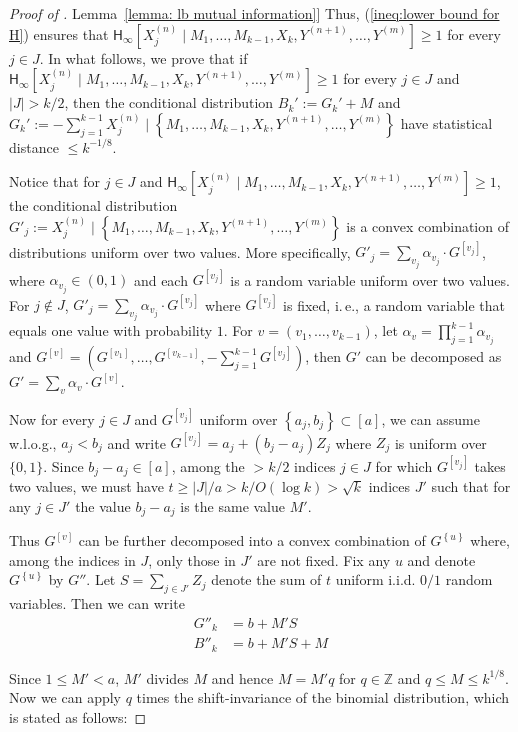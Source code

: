 \documentclass[11pt]{article}
\numberwithin{equation}{section}
\theoremstyle{definition}
\theoremstyle{plain}
\newcommand{\Z}{\mathbb Z}
\newcommand{\ie}{i.\,e.}
\newcommand{\expref}[2]{\hyperref[#2]{#1~\ref{#2}}}
\newcommand{\set}[1]{{\left \{{#1} \right \}}}
\newcommand{\cond}{\;|\;}
\newcommand{\Cond}{\;\Big|\;}
\newcommand{\zo}{\ensuremath{ \{ 0, 1 \} }}
\newcommand{\bigo}[1]{\ensuremath{{{O} \left( {#1} \right)}}}
\newcommand{\eqdef}{\ensuremath{:=}}
\newcommand{\Hmin}{\ensuremath{\mathsf{H}_{\infty}}}
\begin{document}
\begin{proof}[Proof of \expref{Lemma}{lemma: lb mutual information}]
		Thus, (\ref{ineq:lower bound for H}) ensures that $\Hmin\left[X^{(n)}_{j} \cond M_1,\ldots, M_{k-1}, X_k, Y^{(n+1)},\ldots, Y^{(m)} \right]\ge 1$ for every $j\in J$.
%
		In what follows, we prove that if $\Hmin\left[X^{(n)}_{j} \cond M_1,\ldots, M_{k-1}, X_k, Y^{(n+1)},\ldots, Y^{(m)} \right]\ge 1$ for every $j\in J$ and $|J|>k/2$, 
		then the conditional distribution
		$B_k'\eqdef G_k'+M$  and
		$G_k'\eqdef -\sum_{j=1}^{k-1}X^{(n)}_{j} \Cond \set{M_1,\ldots, M_{k-1}, X_k, Y^{(n+1)},\ldots, Y^{(m)}}$ have statistical distance $\le k^{-1/8}$.

		Notice that for $j\in J$ and $\Hmin\left[X^{(n)}_{j} \cond M_1,\ldots, M_{k-1}, X_k, Y^{(n+1)},\ldots, Y^{(m)} \right]\ge 1$,
		the conditional distribution 
		$G'_j\eqdef X^{(n)}_{j} \Cond \set{M_1,\ldots, M_{k-1}, X_k, Y^{(n+1)},\ldots, Y^{(m)}}$ is a convex combination of distributions uniform over two values.
		More specifically, $G'_j=\sum_{v_j} \alpha_{v_j}\cdot G^{[v_j]}$, where $\alpha_{v_j}\in (0,1)$  and each $G^{[v_j]}$ is a random variable uniform over two values. %
		For $j\notin J$, $G'_j=\sum_{v_j} \alpha_{v_j} \cdot G^{[v_j]} $ where $G^{[v_j]}$ is fixed, \ie, a random variable that equals one value with probability $1$.
		For $v=(v_1,\dots,v_{k-1})$, let $\alpha_v=\prod_{j=1}^{k-1}\alpha_{v_j}$ and $G^{[v]}=\left(G^{[v_1]},\ldots,G^{[v_{k-1}]}, -\sum_{j=1}^{k-1} G^{[v_j]}\right)$,
		then $G'$ can be decomposed as
		$G'=\sum_{v} \alpha_v\cdot G^{[v]}$. 


		Now for every $j\in J$ and $G^{[v_j]}$ uniform over $\set{a_j,b_j}\subset [a]$,
		we can assume w.l.o.g., $a_j<b_j$ and write $G^{[v_j]}=a_j + (b_j-a_j) Z_j$ where $Z_j$ is uniform over $\zo$.
		Since $b_j-a_j\in [a]$, among the $>k/2$ indices $j\in J$ for which $G^{[v_j]}$ takes two values, 
		we must have $t\ge |J|/a>k/\bigo{\log k}>\sqrt{k}$ indices $J'$ such that for any $j\in J'$ the value $b_j-a_j$ is the same value $M'$.

		Thus $G^{[v]}$ can be further decomposed into a convex combination of $G^\set{u}$ where, among the indices in $J$, only those in $J'$ are not fixed.
		Fix any $u$ and denote $G^\set{u}$ by $G''$.
		Let $S=\sum_{j\in J'} Z_j$ denote the sum of $t$ uniform i.i.d. $0/1$ random variables.
		Then we can write
		\begin{align*}
			G''_k &= b + M' S\\
			B''_k &= b + M' S + M
		\end{align*}

		Since $1\le M'<a$, $M'$ divides $M$ and hence $M=M'q$ for $q\in \Z$ and $q\le M\le k^{1/8}$.
%
		Now we can apply $q$ times the shift-invariance of the binomial distribution, which is stated as follows:


\end{proof}
\end{document}
